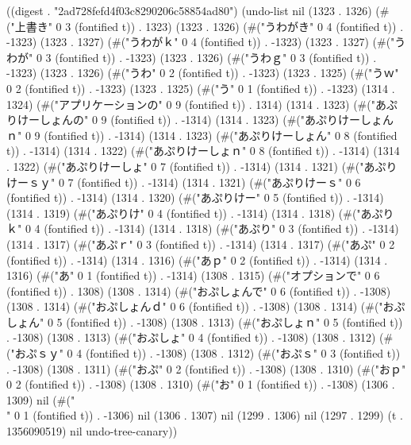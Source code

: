 
((digest . "2ad728fefd4f03c8290206c58854ad80") (undo-list nil (1323 . 1326) (#("上書き" 0 3 (fontified t)) . 1323) (1323 . 1326) (#("うわがき" 0 4 (fontified t)) . -1323) (1323 . 1327) (#("うわがｋ" 0 4 (fontified t)) . -1323) (1323 . 1327) (#("うわが" 0 3 (fontified t)) . -1323) (1323 . 1326) (#("うわｇ" 0 3 (fontified t)) . -1323) (1323 . 1326) (#("うわ" 0 2 (fontified t)) . -1323) (1323 . 1325) (#("うｗ" 0 2 (fontified t)) . -1323) (1323 . 1325) (#("う" 0 1 (fontified t)) . -1323) (1314 . 1324) (#("アプリケーションの" 0 9 (fontified t)) . 1314) (1314 . 1323) (#("あぷりけーしょんの" 0 9 (fontified t)) . -1314) (1314 . 1323) (#("あぷりけーしょんｎ" 0 9 (fontified t)) . -1314) (1314 . 1323) (#("あぷりけーしょん" 0 8 (fontified t)) . -1314) (1314 . 1322) (#("あぷりけーしょｎ" 0 8 (fontified t)) . -1314) (1314 . 1322) (#("あぷりけーしょ" 0 7 (fontified t)) . -1314) (1314 . 1321) (#("あぷりけーｓｙ" 0 7 (fontified t)) . -1314) (1314 . 1321) (#("あぷりけーｓ" 0 6 (fontified t)) . -1314) (1314 . 1320) (#("あぷりけー" 0 5 (fontified t)) . -1314) (1314 . 1319) (#("あぷりけ" 0 4 (fontified t)) . -1314) (1314 . 1318) (#("あぷりｋ" 0 4 (fontified t)) . -1314) (1314 . 1318) (#("あぷり" 0 3 (fontified t)) . -1314) (1314 . 1317) (#("あぷｒ" 0 3 (fontified t)) . -1314) (1314 . 1317) (#("あぷ" 0 2 (fontified t)) . -1314) (1314 . 1316) (#("あｐ" 0 2 (fontified t)) . -1314) (1314 . 1316) (#("あ" 0 1 (fontified t)) . -1314) (1308 . 1315) (#("オプションで" 0 6 (fontified t)) . 1308) (1308 . 1314) (#("おぷしょんで" 0 6 (fontified t)) . -1308) (1308 . 1314) (#("おぷしょんｄ" 0 6 (fontified t)) . -1308) (1308 . 1314) (#("おぷしょん" 0 5 (fontified t)) . -1308) (1308 . 1313) (#("おぷしょｎ" 0 5 (fontified t)) . -1308) (1308 . 1313) (#("おぷしょ" 0 4 (fontified t)) . -1308) (1308 . 1312) (#("おぷｓｙ" 0 4 (fontified t)) . -1308) (1308 . 1312) (#("おぷｓ" 0 3 (fontified t)) . -1308) (1308 . 1311) (#("おぷ" 0 2 (fontified t)) . -1308) (1308 . 1310) (#("おｐ" 0 2 (fontified t)) . -1308) (1308 . 1310) (#("お" 0 1 (fontified t)) . -1308) (1306 . 1309) nil (#("\\" 0 1 (fontified t)) . -1306) nil (1306 . 1307) nil (1299 . 1306) nil (1297 . 1299) (t . 1356090519) nil undo-tree-canary))
